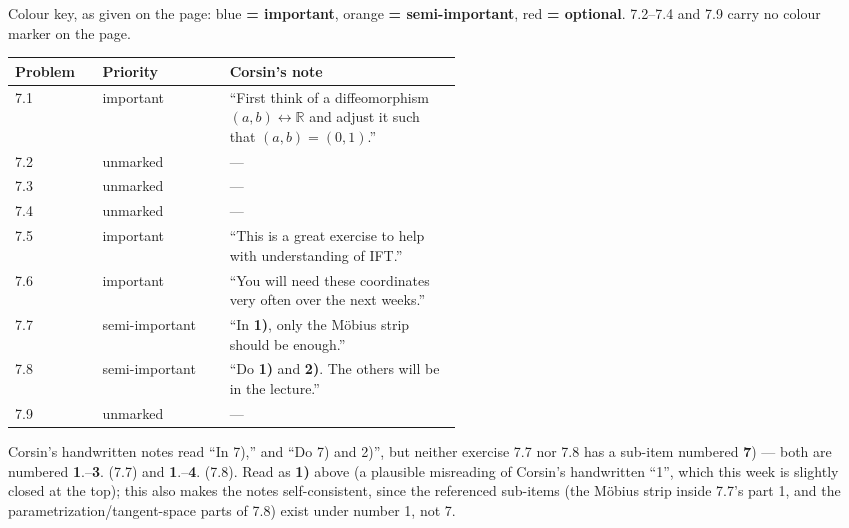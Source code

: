 \begin{ainote}
Colour key, as given on the page: blue \textbf{= important}, orange \textbf{= semi-important},
red \textbf{= optional}. 7.2--7.4 and 7.9 carry no colour marker on the page.

\begin{center}
\begin{tabular}{@{}l l p{0.52\linewidth}@{}}
\textbf{Problem} & \textbf{Priority} & \textbf{Corsin's note} \\
\hline
7.1 & important & ``First think of a diffeomorphism $(a,b) \leftrightarrow \mathbb{R}$ and
  adjust it such that $(a,b)=(0,1)$.'' \\[3pt]
7.2 & unmarked & --- \\[3pt]
7.3 & unmarked & --- \\[3pt]
7.4 & unmarked & --- \\[3pt]
7.5 & important & ``This is a great exercise to help with understanding of IFT.'' \\[3pt]
7.6 & important & ``You will need these coordinates very often over the next weeks.'' \\[3pt]
7.7 & semi-important & ``In \textbf{1)}, only the M\"obius strip should be enough.'' \\[3pt]
7.8 & semi-important & ``Do \textbf{1)} and \textbf{2)}. The others will be in the lecture.'' \\[3pt]
7.9 & unmarked & --- \\
\end{tabular}
\end{center}
\end{ainote}

\begin{ainote}
Corsin's handwritten notes read ``In 7),'' and ``Do 7) and 2)'', but neither exercise 7.7 nor 7.8
has a sub-item numbered \textbf{7}) --- both are numbered \textbf{1}.--\textbf{3}. (7.7) and
\textbf{1}.--\textbf{4}. (7.8). Read as \textbf{1)} above (a plausible misreading of Corsin's
handwritten ``1'', which this week is slightly closed at the top); this also makes the notes
self-consistent, since the referenced sub-items (the M\"obius strip inside 7.7's part 1, and the
parametrization/tangent-space parts of 7.8) exist under number 1, not 7.
\end{ainote}


